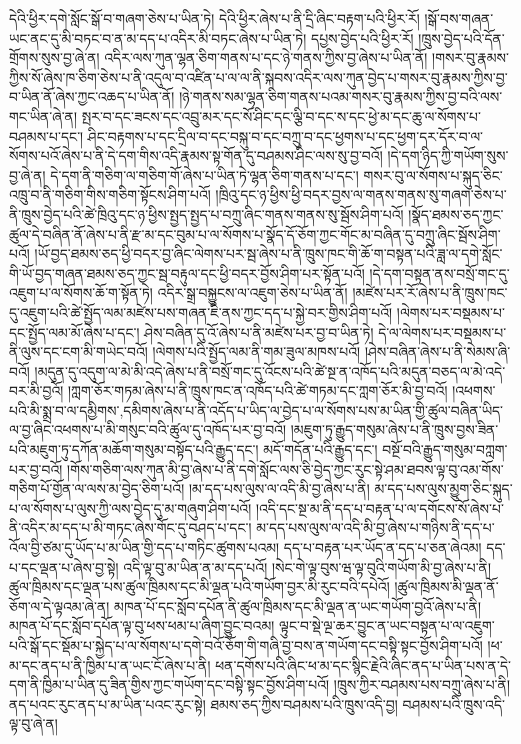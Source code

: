 དེའི་ཕྱིར་དགེ་སློང་སྒོ་བ་གཞག་ཅེས་པ་ཡིན་ཏེ། དེའི་ཕྱིར་ཞེས་པ་ནི་དྲི་ཞིང་བརྟག་པའི་ཕྱིར་རོ། །སྒོ་བས་གཞན་ཡང་ནང་དུ་མི་བཏང་བ་ན་མ་དད་པ་འདིར་མི་བཏང་ཞེས་པ་ཡིན་ཏེ། དཔྱས་བྱེད་པའི་ཕྱིར་རོ། །ཁྲུས་བྱེད་པའི་དོན་གྲོགས་སུས་བྱ་ཞེ་ན། འདིར་ལས་ཀུན་ལྷན་ཅིག་གནས་པ་དང་ཉེ་གནས་ཀྱིས་བྱ་ཞེས་པ་ཡིན་ནོ། །གསར་བུ་རྣམས་ཀྱིས་སོ་ཞེས་ཁ་ཅིག་ཅེས་པ་ནི་འདུལ་བ་འཛིན་པ་ལ་ལ་ནི་སྐབས་འདིར་ལས་ཀུན་བྱེད་པ་གསར་བུ་རྣམས་ཀྱིས་བྱ་བ་ཡིན་ནོ་ཞེས་ཀྱང་འཆད་པ་ཡིན་ནོ། །ཉེ་གནས་སམ་ལྷན་ཅིག་གནས་པའམ་གསར་བུ་རྣམས་ཀྱིས་བྱ་བའི་ལས་གང་ཡིན་ཞེ་ན། སྤར་བ་དང་ཟངས་དང་འབྲུ་མར་དང་སོ་ཤིང་དང་ལྕི་བ་དང་ས་དང་ཕྱེ་མ་དང་ཆུ་ལ་སོགས་པ་བཤམས་པ་དང་། ཤིང་བརྟགས་པ་དང་དྲིལ་བ་དང་བསྐུ་བ་དང་བཀྲུ་བ་དང་ཕྱགས་པ་དང་ཕྱག་དར་དོར་བ་ལ་སོགས་པའོ་ཞེས་པ་ནི་དེ་དག་གིས་འདི་རྣམས་སྟ་གོན་དུ་བཤམས་ཤིང་ལས་སུ་བྱ་བའོ། །དེ་དག་ཉིད་ཀྱི་གཡོག་སུས་བྱ་ཞེ་ན། དེ་དག་ནི་གཅིག་ལ་གཅིག་གོ་ཞེས་པ་ཡིན་ཏེ་ལྷན་ཅིག་གནས་པ་དང་། གསར་བུ་ལ་སོགས་པ་སྐུད་ཅིང་འཁྲུ་བ་ནི་གཅིག་གིས་གཅིག་སྟོངས་ཤིག་པའོ། །ཁྲིའུ་དང་ཉ་ཕྱིས་ཕྱི་བདར་བྱས་ལ་གནས་གནས་སུ་གཞག་ཅེས་པ་ནི་ཁྲུས་བྱེད་པའི་ཚེ་ཁྲིའུ་དང་ཉ་ཕྱིས་སྤྱད་སྤྱད་པ་བཀྲུ་ཞིང་གནས་གནས་སུ་སྦོས་ཤིག་པའོ། །སྣོད་ཐམས་ཅད་ཀྱང་ཚུལ་དེ་བཞིན་ནོ་ཞེས་པ་ནི་རྫ་མ་དང་བུམ་པ་ལ་སོགས་པ་སྣོད་དོ་ཅོག་ཀྱང་གོང་མ་བཞིན་དུ་བཀྲུ་ཞིང་སྦོས་ཤིག་པའོ། །ཡོ་བྱད་ཐམས་ཅད་ཕྱི་བདར་བྱ་ཞིང་ལེགས་པར་སྦ་ཞེས་པ་ནི་ཁྲུས་ཁང་གི་ཆོ་ག་བསྟན་པའི་ཟླ་ལ་དགེ་སློང་གི་ཡོ་བྱད་གཞན་ཐམས་ཅད་ཀྱང་སྦ་བརྟུལ་དང་ཕྱི་བདར་བྱོས་ཤིག་པར་སྟོན་པའོ། །དེ་དག་བསྟན་ནས་བསྲོ་གང་དུ་འཇུག་པ་ལ་སོགས་ཆོ་ག་སྟོན་ཏེ། འདིར་སྒྲ་བསྐྱུངས་ལ་འཇུག་ཅེས་པ་ཡིན་ནོ། །མཛེས་པར་རོ་ཞེས་པ་ནི་ཁྲུས་ཁང་དུ་འཇུག་པའི་ཚེ་སྤྱོད་ལམ་མཛེས་པས་གཞན་ཇི་ནས་ཀྱང་དད་པ་སྐྱེ་བར་གྱིས་ཤིག་པའོ། །ལེགས་པར་བསྡམས་པ་དང་སྤྱོད་ལམ་མོ་ཞེས་པ་དང་། ཤེས་བཞིན་དུ་འོ་ཞེས་པ་ནི་མཛེས་པར་བྱ་བ་ཡིན་ཏེ། དེ་ལ་ལེགས་པར་བསྡམས་པ་ནི་ལུས་དང་ངག་མི་གཡེང་བའོ། །ལེགས་པའི་སྤྱོད་ལམ་ནི་གམ་ཟུལ་མཁས་པའོ། །ཤེས་བཞིན་ཞེས་པ་ནི་སེམས་ཞི་བའོ། །མདུན་དུ་འདུག་ལ་མེ་མི་འདེ་ཞེས་པ་ནི་བསྲོ་གང་དུ་འོངས་པའི་ཚེ་སྔ་ན་འཁོད་པའི་མདུན་བཅད་ལ་མེ་འདེ་བར་མི་བྱའོ། །ཀླག་ཅོར་གཏམ་ཞེས་པ་ནི་ཁྲུས་ཁང་ན་འཁོད་པའི་ཚེ་གཏམ་དང་ཀླག་ཅོར་མི་བྱ་བའོ། །འཕགས་པའི་མི་སྨྲ་བ་ལ་{དམྱིགས་,དམིགས་}ཞེས་པ་ནི་འདོད་པ་ཡིད་ལ་བྱེད་པ་ལ་སོགས་པས་མ་ཡིན་གྱི་ཚུལ་བཞིན་ཡིད་ལ་བྱ་ཞིང་འཕགས་པ་མི་གསུང་བའི་ཚུལ་དུ་འཁོད་པར་བྱ་བའོ། །མཇུག་ཏུ་རྒྱུད་གསུམ་ཞེས་པ་ནི་ཁྲུས་བྱས་ཟིན་པའི་མཇུག་ཏུ་དཀོན་མཆོག་གསུམ་བསྟོད་པའི་རྒྱུད་དང་། མདོ་གདོན་པའི་རྒྱུད་དང་། བསྔོ་བའི་རྒྱུད་གསུམ་བཀླག་པར་བྱ་བའོ། །གོས་གཅིག་ལས་ཀུན་མི་བྱ་ཞེས་པ་ནི་དགེ་སློང་ལས་ཅི་བྱེད་ཀྱང་རུང་སྟེ་ཤམ་ཐབས་ལྟ་བུ་འམ་གོས་གཅིག་པོ་གྱོན་ལ་ལས་མ་བྱེད་ཅིག་པའོ། །མ་དད་པས་ལུས་ལ་འདི་མི་བྱ་ཞེས་པ་ནི། མ་དད་པས་ལུས་མྱུག་ཅིང་སྐུད་པ་ལ་སོགས་པ་ལུས་ཀྱི་ལས་བྱེད་དུ་མ་གཞུག་ཤིག་པའོ། །འདི་དང་སྔ་མ་ནི་དད་པ་བརྟན་པ་ལ་དགོངས་སོ་ཞེས་པ་ནི་འདིར་མ་དད་པ་མི་གཏང་ཞེས་གོང་དུ་བཤད་པ་དང་། མ་དད་པས་ལུས་ལ་འདི་མི་བྱ་ཞེས་པ་གཉིས་ནི་དད་པ་འོལ་བྱི་ཙམ་དུ་ཡོད་པ་མ་ཡིན་གྱི་དད་པ་གཏིང་ཚུགས་པའམ། དད་པ་བརྟན་པར་ཡོད་ན་དད་པ་ཅན་ཞེའམ། དད་པ་དང་ལྡན་པ་ཞེས་བྱ་སྟེ། འདི་ལྟ་བུ་མ་ཡིན་ན་མ་དད་པའོ། །སེང་གེ་ལྟ་བུས་ཝ་ལྟ་བུའི་གཡོག་མི་བྱ་ཞེས་པ་ནི། ཚུལ་ཁྲིམས་དང་ལྡན་པས་ཚུལ་ཁྲིམས་དང་མི་ལྡན་པའི་གཡོག་བྱར་མི་རུང་བའི་དཔེའོ། །ཚུལ་ཁྲིམས་མི་ལྡན་ནོ་ཅོག་ལ་དེ་ལྟའམ་ཞེ་ན། མཁན་པོ་དང་སློབ་དཔོན་ནི་ཚུལ་ཁྲིམས་དང་མི་ལྡན་ན་ཡང་གཡོག་བྱའོ་ཞེས་པ་ནི། མཁན་པོ་དང་སློབ་དཔོན་ལྟ་བུ་ཕས་ཕམ་པ་ཞིག་བྱུང་བའམ། ལྟུང་བ་སྡེ་ལྔ་ཆར་བྱུང་ན་ཡང་བསྟན་པ་ལ་འཇུག་པའི་སྒོ་དང་སྡོམ་པ་སྐྱེད་པ་ལ་སོགས་པ་དགེ་བའོ་ཅོག་གི་གཞི་བྱ་བས་ན་གཡོག་དང་བསྟི་སྟང་བྱོས་ཤིག་པའོ། །ཕ་མ་དང་ནད་པ་ནི་ཁྱིམ་པ་ན་ཡང་ངོ་ཞེས་པ་ནི། ཕན་དགོས་པའི་ཞིང་ཕ་མ་དང་སྙིང་རྗེའི་ཞིང་ནད་པ་ཡིན་པས་ན་དེ་དག་ནི་ཁྱིམ་པ་ཡིན་དུ་ཟིན་གྱིས་ཀྱང་གཡོག་དང་བསྟི་སྟང་བྱོས་ཤིག་པའོ། །ཁྲུས་ཀྱིར་བཤམས་པས་བཀྲུ་ཞེས་པ་ནི། ནད་པའང་རུང་ནད་པ་མ་ཡིན་པའང་རུང་སྟེ། ཐམས་ཅད་ཀྱིས་བཤམས་པའི་ཁྲུས་འདི་བྱ། བཤམས་པའི་ཁྲུས་འདི་ལྟ་བུ་ཞེ་ན། 